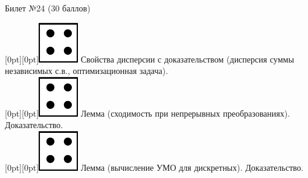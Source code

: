 \documentclass[10pt]{article}
\begin{document}
\thispagestyle{empty}

\topskip=0pt

\vspace*{\fill}

\begin{center} {\Large Билет №24 (30 баллов)} \end{center}

\raisebox{-1pt}[0pt][0pt]{\includegraphics[width=0.02\linewidth]{4.png}} Свойства дисперсии с доказательством (дисперсия суммы независимых с.в., оптимизационная задача). \\ 

\raisebox{-1pt}[0pt][0pt]{\includegraphics[width=0.02\linewidth]{4.png}} Лемма  (сходимость при непрерывных преобразованиях). Доказательство. \\

\raisebox{-1pt}[0pt][0pt]{\includegraphics[width=0.02\linewidth]{4.png}} Лемма (вычисление УМО для дискретных). Доказательство. \\









\vspace*{\fill}
\end{document}
